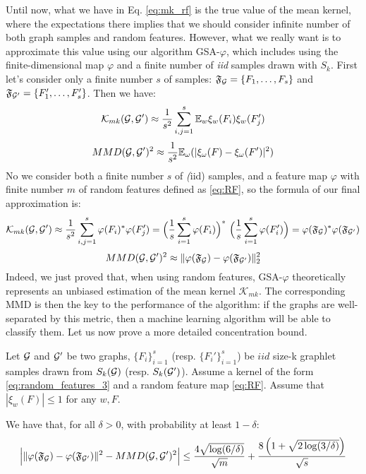 Until now, what we have in Eq. \ref{eq:mk_rf} is the true value of the mean kernel, where the expectations there implies that we should consider infinite number of both graph samples and random features. However, what we really want is to approximate this value using our algorithm GSA-$\varphi$, which includes  using the finite-dimensional map $\varphi$ and a finite number of \emph{iid} samples drawn with $S_k$. First let's consider only a finite number $s$ of samples: $\mathfrak{F}_{\mathcal{G}}=\{F_1, \ldots, F_s\}$ and $\mathfrak{F}_{\mathcal{G}'}=\{F'_1, \ldots, F'_s\}$. Then we have: 
\begin{equation}
\label{eq:MK_samples}
\mathcal{K}_{mk}(\mathcal{G},\mathcal{G}') \approx \frac{1}{s^2} \sum_{i,j=1}^s \mathbb{E}_w \xi_w(F_i)\xi_w(F'_j)
\end{equation}
\[
MMD(\mathcal{G},\mathcal{G}')^2 \approx \frac{1}{s^2}\mathbb{E}_{\omega} ( | \xi_\omega(F) -\xi_\omega(F') |^2 )
\]
No we consider both a finite number $s$ of \emph(iid) samples, and a feature map $\varphi$ with finite number $m$ of random features defined as \eqref{eq:RF}, so the formula of our final approximation is:
\begin{equation}
\label{eq:mean_kernel_RF}
\mathcal{K}_{mk}(\mathcal{G},\mathcal{G}') \approx \frac{1}{s^2} \sum_{i,j=1}^s \varphi(F_i)^*\varphi(F_j')=\Big(\frac{1}{s}\sum_{i=1}^s\varphi(F_i)\Big)^*~\Big(\frac{1}{s}\sum_{i=1}^s\varphi(F_i')\Big) = {\varphi}(\mathfrak{F}_{\mathcal{G}})^* {\varphi}(\mathfrak{F}_{\mathcal{G}'})
\end{equation}
\[
MMD(\mathcal{G},\mathcal{G}')^2 \approx  \| {\varphi}(\mathfrak{F}_{\mathcal{G}}) - {\varphi}(\mathfrak{F}_{\mathcal{G}'}) \|_2^2 
\]
Indeed, we just proved that, when using random features, GSA-$\varphi$ theoretically represents an unbiased estimation of the mean kernel $\mathcal{K}_{mk}$. The corresponding MMD is then the key to the performance of the algorithm: if the graphs are well-separated by this metric, then a machine learning algorithm will be able to classify them.
%
Let us now prove a more detailed concentration bound.
\begin{theorem}
\label{theorem:concentration}
Let $\mathcal{G}$ and $\mathcal{G}'$ be two graphs, $\{F_i\}_{i=1}^{s}$ (resp. $\{F_i'\}_{i=1}^{s}$) be $iid$ size-k graphlet samples drawn from $S_k(\mathcal{G})$ (resp. $S_k(\mathcal{G}')$). Assume a kernel of the form \eqref{eq:random_features_3} and a random feature map \eqref{eq:RF}. Assume that $|\xi_w(F)| \leq 1$ for any $w,F$.

We have that, for all $\delta>0$, with probability at least $1-\delta$:
\begin{align*}
 \Big|\|\varphi(\mathfrak{F}_{\mathcal{G}}) - \varphi(\mathfrak{F}_{\mathcal{G}'})\|^2 - MMD(\mathcal{G},\mathcal{G}')^2 \Big| \leq \frac{4 \sqrt{\log (6/\delta)}}{\sqrt{m}} + \frac{8\left(1+\sqrt{2\log(3/\delta)}\right)}{\sqrt{{s}}}
\end{align*}
\end{theorem}
